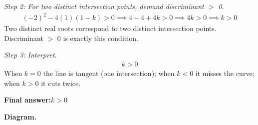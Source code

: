 \documentclass[11pt]{article}
\begin{document}
\textit{Step 2: For two distinct intersection points, demand discriminant $>$ 0.}
\[\begin{gathered}
(-2)^2 - 4(1)(1 - k) > 0 \implies 4 - 4 + 4k > 0 \implies 4k > 0 \implies k > 0
\end{gathered}\]
Two distinct real roots correspond to two distinct intersection points. Discriminant $>$ 0 is exactly this condition.

\textit{Step 3: Interpret.}
\[\begin{gathered}
k > 0
\end{gathered}\]
When \( k = 0 \) the line is tangent (one intersection); when \( k < 0 \) it misses the curve; when \( k > 0 \) it cuts twice.

\begin{answerbox}
\textbf{Final answer:}\quad \(\displaystyle k > 0\)
\end{answerbox}
\textbf{Diagram.}
\end{document}
